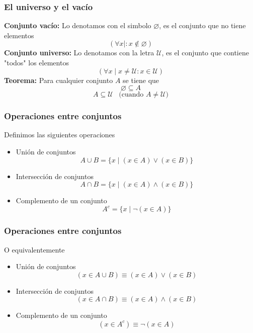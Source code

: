 \documentclass{beamer}
\begin{document}
\begin{frame}[fragile]
    \frametitle{El universo y el vacío}
    \pause
    \textbf{Conjunto vacío:} Lo denotamos con el simbolo $\varnothing$, es el conjunto que no tiene elementos
    \pause
    $$(\forall x \mid : x \not \in \varnothing)$$
    \pause
    \textbf{Conjunto universo:} Lo denotamos con la letra $\mathcal{U}$, es el conjunto que contiene "todos" los elementos
    \pause
    $$(\forall x \mid x \neq \mathcal{U}: x \in \mathcal{U})$$
    \pause
    \textbf{Teorema:} Para cualquier conjunto $A$ se tiene que
    \pause
    $$\varnothing \subseteq A$$
    $$A \subseteq \mathcal{U} \hspace{10pt} \text{(cuando $A \neq \mathcal{U}$)}$$
\end{frame}

\begin{frame}[fragile]
    \frametitle{Operaciones entre conjuntos}
    Definimos las siguientes operaciones
    \begin{itemize}
        \item Unión de conjuntos
        $$A \cup B = \{x \mid (x \in A) \lor (x \in B)\}$$
        \item Intersección de conjuntos
        $$A \cap B = \{x \mid (x \in A) \land (x \in B)\}$$
        \item Complemento de un conjunto
        $$A^{c} = \{x \mid \lnot(x \in A)\}$$
    \end{itemize}
\end{frame}

\begin{frame}[fragile]
    \frametitle{Operaciones entre conjuntos}
    O equivalentemente
    \begin{itemize}
        \item Unión de conjuntos
        $$(x \in A \cup B) \equiv (x \in A) \lor (x \in B)$$
        \item Intersección de conjuntos
        $$(x \in A \cap B) \equiv (x \in A) \land (x \in B)$$
        \item Complemento de un conjunto
        $$(x \in A ^c) \equiv \lnot (x \in A)$$
    \end{itemize}
\end{frame}
\end{document}
